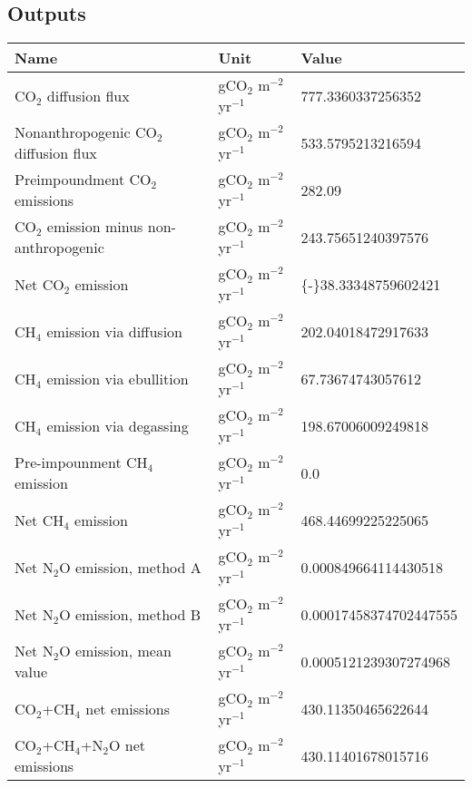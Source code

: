 \documentclass{article}%
\begin{document}
%
\subsection{Outputs}%
\label{subsec:Outputs}%
\begin{center}%
\renewcommand{\arraystretch}{1.0}%
\begin{tabu}{@{}p{10cm} X[c] X[l]@{}}%
\toprule%
\textbf{Name}&\textbf{Unit}&\textbf{Value}\\%
\midrule%
CO$_2$ diffusion flux&gCO$_2$ m$^{-2}$ yr$^{-1}$&\num[round-precision=4,round-mode=figures]{777.3360337256352}\\%
Nonanthropogenic CO$_2$ diffusion flux&gCO$_2$ m$^{-2}$ yr$^{-1}$&\num[round-precision=4,round-mode=figures]{533.5795213216594}\\%
Preimpoundment CO$_2$ emissions&gCO$_2$ m$^{-2}$ yr$^{-1}$&\num[round-precision=4,round-mode=figures]{282.09}\\%
CO$_2$ emission minus non-anthropogenic&gCO$_2$ m$^{-2}$ yr$^{-1}$&\num[round-precision=4,round-mode=figures]{243.75651240397576}\\%
Net CO$_2$ emission&gCO$_2$ m$^{-2}$ yr$^{-1}$&\num[round-precision=4,round-mode=figures]{{-}38.33348759602421}\\%
CH$_4$ emission via diffusion&gCO$_2$ m$^{-2}$ yr$^{-1}$&\num[round-precision=4,round-mode=figures]{202.04018472917633}\\%
CH$_4$ emission via ebullition&gCO$_2$ m$^{-2}$ yr$^{-1}$&\num[round-precision=4,round-mode=figures]{67.73674743057612}\\%
CH$_4$ emission via degassing&gCO$_2$ m$^{-2}$ yr$^{-1}$&\num[round-precision=4,round-mode=figures]{198.67006009249818}\\%
Pre-impounment CH$_4$ emission&gCO$_2$ m$^{-2}$ yr$^{-1}$&\num[round-precision=4,round-mode=figures]{0.0}\\%
Net CH$_4$ emission&gCO$_2$ m$^{-2}$ yr$^{-1}$&\num[round-precision=4,round-mode=figures]{468.44699225225065}\\%
Net N$_2$O emission, method A&gCO$_2$ m$^{-2}$ yr$^{-1}$&\num[round-precision=4,round-mode=figures]{0.000849664114430518}\\%
Net N$_2$O emission, method B&gCO$_2$ m$^{-2}$ yr$^{-1}$&\num[round-precision=4,round-mode=figures]{0.00017458374702447555}\\%
Net N$_2$O emission, mean value&gCO$_2$ m$^{-2}$ yr$^{-1}$&\num[round-precision=4,round-mode=figures]{0.0005121239307274968}\\%
\midrule%
CO$_2$+CH$_4$ net emissions&gCO$_2$ m$^{-2}$ yr$^{-1}$&\num[round-precision=4,round-mode=figures]{430.11350465622644}\\%
\midrule%
CO$_2$+CH$_4$+N$_2$O net emissions&gCO$_2$ m$^{-2}$ yr$^{-1}$&\num[round-precision=4,round-mode=figures]{430.11401678015716}\\\bottomrule%
%
\end{tabu}%
\end{center}%
\end{document}
